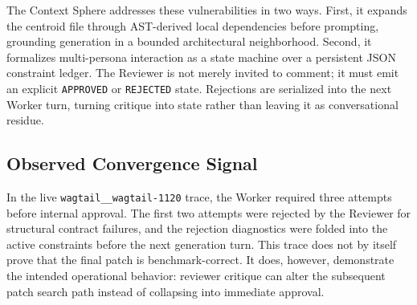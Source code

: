 The Context Sphere addresses these vulnerabilities in two ways. First, it expands the centroid file through AST-derived local dependencies before prompting, grounding generation in a bounded architectural neighborhood. Second, it formalizes multi-persona interaction as a state machine over a persistent JSON constraint ledger. The Reviewer is not merely invited to comment; it must emit an explicit \texttt{APPROVED} or \texttt{REJECTED} state. Rejections are serialized into the next Worker turn, turning critique into state rather than leaving it as conversational residue.

\subsection{Observed Convergence Signal}

In the live \texttt{wagtail\_\_wagtail-1120} trace, the Worker required three attempts before internal approval. The first two attempts were rejected by the Reviewer for structural contract failures, and the rejection diagnostics were folded into the active constraints before the next generation turn. This trace does not by itself prove that the final patch is benchmark-correct. It does, however, demonstrate the intended operational behavior: reviewer critique can alter the subsequent patch search path instead of collapsing into immediate approval.

